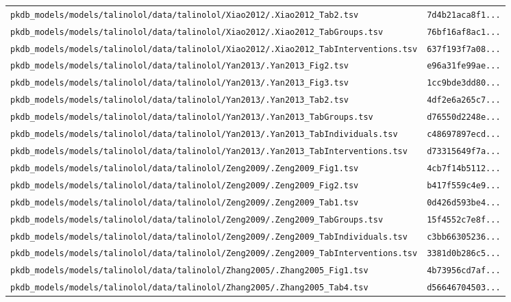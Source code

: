 \begin{longtable}{ll}
\texttt{pkdb\_models/models/talinolol/data/talinolol/Xiao2012/.Xiao2012\_Tab2.tsv} & \texttt{7d4b21aca8f1...} \\
\texttt{pkdb\_models/models/talinolol/data/talinolol/Xiao2012/.Xiao2012\_TabGroups.tsv} & \texttt{76bf16af8ac1...} \\
\texttt{pkdb\_models/models/talinolol/data/talinolol/Xiao2012/.Xiao2012\_TabInterventions.tsv} & \texttt{637f193f7a08...} \\
\texttt{pkdb\_models/models/talinolol/data/talinolol/Yan2013/.Yan2013\_Fig2.tsv} & \texttt{e96a31fe99ae...} \\
\texttt{pkdb\_models/models/talinolol/data/talinolol/Yan2013/.Yan2013\_Fig3.tsv} & \texttt{1cc9bde3dd80...} \\
\texttt{pkdb\_models/models/talinolol/data/talinolol/Yan2013/.Yan2013\_Tab2.tsv} & \texttt{4df2e6a265c7...} \\
\texttt{pkdb\_models/models/talinolol/data/talinolol/Yan2013/.Yan2013\_TabGroups.tsv} & \texttt{d76550d2248e...} \\
\texttt{pkdb\_models/models/talinolol/data/talinolol/Yan2013/.Yan2013\_TabIndividuals.tsv} & \texttt{c48697897ecd...} \\
\texttt{pkdb\_models/models/talinolol/data/talinolol/Yan2013/.Yan2013\_TabInterventions.tsv} & \texttt{d73315649f7a...} \\
\texttt{pkdb\_models/models/talinolol/data/talinolol/Zeng2009/.Zeng2009\_Fig1.tsv} & \texttt{4cb7f14b5112...} \\
\texttt{pkdb\_models/models/talinolol/data/talinolol/Zeng2009/.Zeng2009\_Fig2.tsv} & \texttt{b417f559c4e9...} \\
\texttt{pkdb\_models/models/talinolol/data/talinolol/Zeng2009/.Zeng2009\_Tab1.tsv} & \texttt{0d426d593be4...} \\
\texttt{pkdb\_models/models/talinolol/data/talinolol/Zeng2009/.Zeng2009\_TabGroups.tsv} & \texttt{15f4552c7e8f...} \\
\texttt{pkdb\_models/models/talinolol/data/talinolol/Zeng2009/.Zeng2009\_TabIndividuals.tsv} & \texttt{c3bb66305236...} \\
\texttt{pkdb\_models/models/talinolol/data/talinolol/Zeng2009/.Zeng2009\_TabInterventions.tsv} & \texttt{3381d0b286c5...} \\
\texttt{pkdb\_models/models/talinolol/data/talinolol/Zhang2005/.Zhang2005\_Fig1.tsv} & \texttt{4b73956cd7af...} \\
\texttt{pkdb\_models/models/talinolol/data/talinolol/Zhang2005/.Zhang2005\_Tab4.tsv} & \texttt{d56646704503...} \\

\end{longtable}
